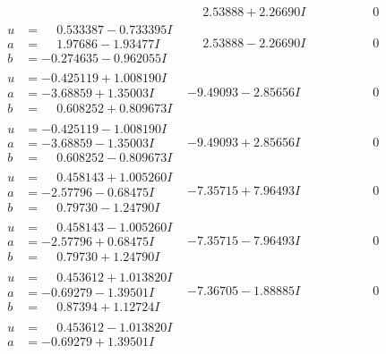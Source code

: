\documentclass[1p]{elsarticle_modified}
\theoremstyle{definition}
\begin{document}
$$\begin{array}{c|c|c}
 & \phantom{-}2.53888 + 2.26690 I & \phantom{-0.000000 } 0 \\ \hline\begin{aligned}
u &= \phantom{-}0.533387 - 0.733395 I \\
a &= \phantom{-}1.97686 - 1.93477 I \\
b &= -0.274635 - 0.962055 I\end{aligned}
 & \phantom{-}2.53888 - 2.26690 I & \phantom{-0.000000 } 0 \\ \hline\begin{aligned}
u &= -0.425119 + 1.008190 I \\
a &= -3.68859 + 1.35003 I \\
b &= \phantom{-}0.608252 + 0.809673 I\end{aligned}
 & -9.49093 - 2.85656 I & \phantom{-0.000000 } 0 \\ \hline\begin{aligned}
u &= -0.425119 - 1.008190 I \\
a &= -3.68859 - 1.35003 I \\
b &= \phantom{-}0.608252 - 0.809673 I\end{aligned}
 & -9.49093 + 2.85656 I & \phantom{-0.000000 } 0 \\ \hline\begin{aligned}
u &= \phantom{-}0.458143 + 1.005260 I \\
a &= -2.57796 - 0.68475 I \\
b &= \phantom{-}0.79730 - 1.24790 I\end{aligned}
 & -7.35715 + 7.96493 I & \phantom{-0.000000 } 0 \\ \hline\begin{aligned}
u &= \phantom{-}0.458143 - 1.005260 I \\
a &= -2.57796 + 0.68475 I \\
b &= \phantom{-}0.79730 + 1.24790 I\end{aligned}
 & -7.35715 - 7.96493 I & \phantom{-0.000000 } 0 \\ \hline\begin{aligned}
u &= \phantom{-}0.453612 + 1.013820 I \\
a &= -0.69279 - 1.39501 I \\
b &= \phantom{-}0.87394 + 1.12724 I\end{aligned}
 & -7.36705 - 1.88885 I & \phantom{-0.000000 } 0 \\ \hline\begin{aligned}
u &= \phantom{-}0.453612 - 1.013820 I \\
a &= -0.69279 + 1.39501 I \\

\end{aligned}
\end{array}$$
\end{document}
